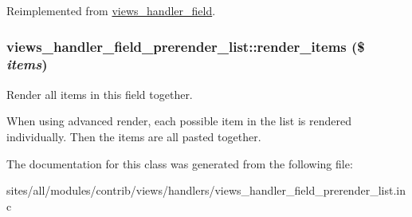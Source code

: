 Reimplemented from \hyperlink{classviews__handler__field_82ff951c5e9ceb97b2eab86f880cbc1e}{views\_\-handler\_\-field}.\hypertarget{classviews__handler__field__prerender__list_7034bf6badaa12c750ac451f4435ce0a}{
\subsubsection[{render\_\-items}]{\setlength{\rightskip}{0pt plus 5cm}views\_\-handler\_\-field\_\-prerender\_\-list::render\_\-items (\$ {\em items})}}
\label{classviews__handler__field__prerender__list_7034bf6badaa12c750ac451f4435ce0a}


Render all items in this field together.

When using advanced render, each possible item in the list is rendered individually. Then the items are all pasted together. 

The documentation for this class was generated from the following file:\begin{CompactItemize}
\item 
sites/all/modules/contrib/views/handlers/views\_\-handler\_\-field\_\-prerender\_\-list.inc\end{CompactItemize}
